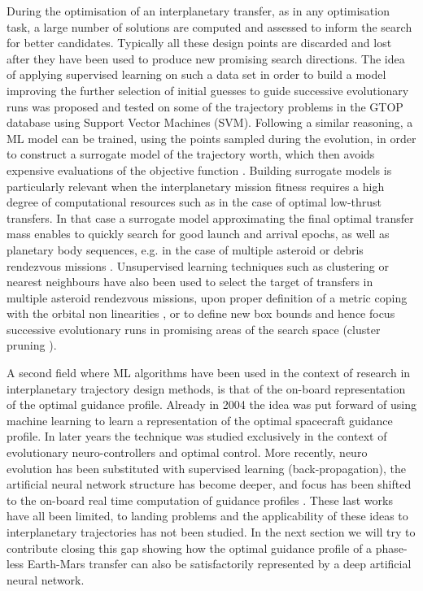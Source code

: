 \documentclass[graybox]{svmult}
\begin{document}
During the optimisation of an interplanetary transfer, as in any optimisation task, a large number of solutions are computed and assessed to inform the search for better candidates. Typically all these design points are discarded and lost after they have been used to produce new promising search directions. The idea of applying supervised learning on such a data set in order to build a model improving the further selection of initial guesses to guide successive evolutionary runs was proposed and tested \cite{cassioli2012machine} on some of the trajectory problems in the GTOP database \cite{vinko2008global} using Support Vector Machines (SVM). Following a similar reasoning, a ML model can be trained, using the points sampled during the evolution, in order to construct a surrogate model of the trajectory worth, which then avoids expensive evaluations of the objective function \cite{ampatzis2009machine}. Building surrogate models is particularly relevant when the interplanetary mission fitness requires a high degree of computational resources such as in the case of optimal low-thrust transfers. In that case a surrogate model approximating the final optimal transfer mass enables to quickly search for good launch and arrival epochs, as well as planetary body sequences, e.g. in the case of multiple asteroid or debris rendezvous missions \cite{hennes2016fast, mereta2017machine}. Unsupervised learning techniques such as clustering or nearest neighbours have also been used to select the target of transfers in multiple asteroid rendezvous missions, upon proper definition of a metric coping with the orbital non linearities \cite{izzo2016designing}, or to define new box bounds and hence focus successive evolutionary runs in promising areas of the search space (cluster pruning \cite{izzo2010global}).

A second field where ML algorithms have been used in the context of research in interplanetary trajectory design methods, is that of the on-board representation of the optimal guidance profile. Already in 2004 \cite{dachwald2004low} the idea was put forward of using machine learning to learn a representation of the optimal spacecraft guidance profile. In later years the technique was studied exclusively in the context of evolutionary neuro-controllers and optimal control. More recently, neuro evolution has been substituted with supervised learning (back-propagation), the artificial neural network structure has become deeper, and focus has been shifted to the on-board real time computation of guidance profiles \cite{sanchez2016real, sanchez2016learning, schiavone2012autonomous}. These last works have all been limited, to landing problems and the applicability of these ideas to interplanetary trajectories has not been studied. In the next section we will try to contribute closing this gap showing how the optimal guidance profile of a phase-less Earth-Mars transfer can also be satisfactorily represented by a deep artificial neural network.
\end{document}
